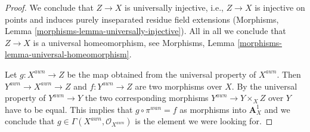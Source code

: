 \documentclass[10pt,a4paper]{amsart}
\theoremstyle{plain}
\theoremstyle{definition}
\theoremstyle{remark}
\numberwithin{equation}{subsection}
\begin{document}
\begin{proof}
\medskip\noindent
We conclude that $Z \to X$ is universally injective, i.e.,
$Z \to X$ is injective on points and induces
purely inseparated residue field extensions
(Morphisms, Lemma \ref{morphisms-lemma-universally-injective}).
All in all we conclude that $Z \to X$ is a universal homeomorphism, see
Morphisms, Lemma \ref{morphisms-lemma-universal-homeomorphism}.

\medskip\noindent
Let $g : X^{awn} \to Z$ be the map obtained from the universal property
of $X^{awn}$. Then $Y^{awn} \to X^{awn} \to Z$ and $f : Y^{awn} \to Z$
are two morphisms over $X$. By the universal property of
$Y^{awn} \to Y$ the two corresponding morphisms
$Y^{awn} \to Y \times_X Z$ over $Y$ have to be equal. This implies
that $g \circ \pi^{wan} = f$ as morphisms into $\mathbf{A}^1_X$
and we conclude that $g \in \Gamma(X^{awn}, \mathcal{O}_{X^{awn}})$
is the element we were looking for.
\end{proof}
\end{document}
